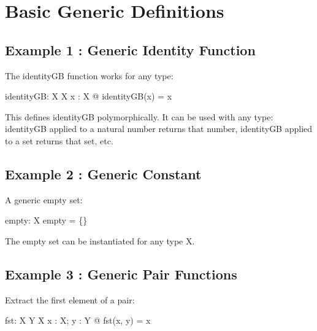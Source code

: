 \documentclass[a4paper,10pt,fleqn]{article}
\begin{document}
\section*{Basic Generic Definitions}

\subsection*{Example 1 : Generic Identity Function}

\noindent The identityGB function works for any type:

\bigskip

\begin{gendef}[X]
  identityGB: X \fun X
\where
  \forall x : X @ identityGB(x) = x
\end{gendef}

\noindent This defines identityGB polymorphically. It can be used with any type: identityGB applied to a natural number returns that number, identityGB applied to a set returns that set, etc.

\bigskip

\subsection*{Example 2 : Generic Constant}

\noindent A generic empty set:

\bigskip

\begin{gendef}[X]
  empty: \power X
\where
  empty = \{\}
\end{gendef}

\noindent The empty set can be instantiated for any type X.

\bigskip

\subsection*{Example 3 : Generic Pair Functions}

\noindent Extract the first element of a pair:

\bigskip

\begin{gendef}[X, Y]
  fst: X \cross Y \fun X
\where
  \forall x : X; y : Y @ fst(x, y) = x
\end{gendef}
\end{document}
